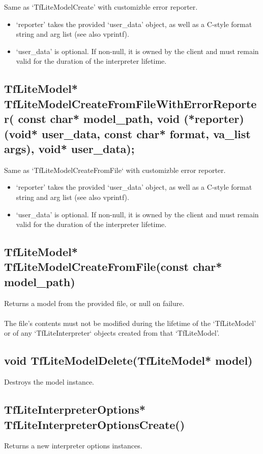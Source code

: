 \documentclass{ol-softwaremanual}
\begin{document}
Same as `TfLiteModelCreate' with customizble error reporter.

\begin{itemize}
    \item `reporter' takes the provided `user\_data' object, as well as a C-style format string and arg list (see also vprintf).
    \item `user\_data' is optional. If non-null, it is owned by the client and must remain valid for the duration of the interpreter lifetime.
\end{itemize}
 
\subsection{TfLiteModel* TfLiteModelCreateFromFileWithErrorReporter(
    const char* model\_path,
    void (*reporter)(void* user\_data, const char* format, va\_list args),
    void* user\_data);}

 Same as `TfLiteModelCreateFromFile` with customizble error reporter.

 \begin{itemize}
     \item `reporter' takes the provided `user\_data' object, as well as a C-style format string and arg list (see also vprintf).
     \item `user\_data' is optional. If non-null, it is owned by the client and must remain valid for the duration of the interpreter lifetime.
 \end{itemize}

\subsection{TfLiteModel* TfLiteModelCreateFromFile(const char* model\_path)}

Returns a model from the provided file, or null on failure.\\\\
The file's contents must not be modified during the lifetime of the
`TfLiteModel' or of any `TfLiteInterpreter` objects created from that `TfLiteModel'.

\subsection{void TfLiteModelDelete(TfLiteModel* model)}
Destroys the model instance.

\subsection{TfLiteInterpreterOptions* TfLiteInterpreterOptionsCreate()}
Returns a new interpreter options instances.
\end{document}
